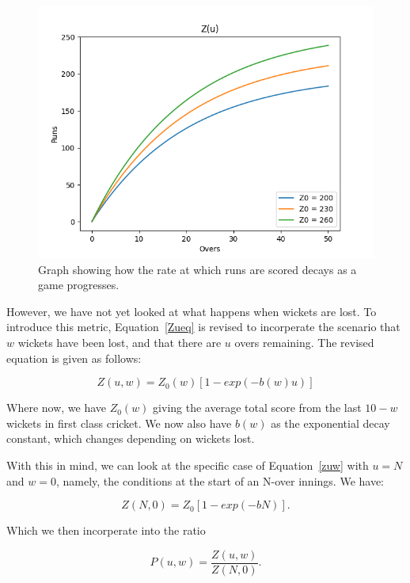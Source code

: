 \begin{figure}[h]
    \centering
    \includegraphics[scale=0.6]{figures/z(u).png}
    \caption{Graph showing how the rate at which runs are scored decays as a game progresses.}
    \label{Zugraph}
\end{figure}

However, we have not yet looked at what happens when wickets are lost. To introduce this metric, Equation~\ref{Zueq}
is revised to incorperate the scenario that $w$ wickets have been lost, and that there are $u$ overs remaining.
The revised equation is given as follows:

\begin{equation}
    Z(u,w) = Z_0(w)[1-exp(-b(w)u)]
    \label{zuw}
\end{equation}

Where now, we have $Z_0(w)$ giving the average total score from the last $10-w$ wickets in first class cricket.
We now also have $b(w)$ as the exponential decay constant, which changes depending on wickets lost.

With this in mind, we can look at the specific case of Equation~\ref{zuw} with $u=N$ and $w=0$, namely, the conditions
at the start of an N-over innings. We have:

\begin{equation}
    Z(N,0) = Z_0[1-exp(-bN)].
    \label{zstart}
\end{equation}

Which we then incorperate into the ratio

\begin{equation}
    P(u,w) = \frac{Z(u,w)}{Z(N,0)}.
    \label{prat}
\end{equation}

